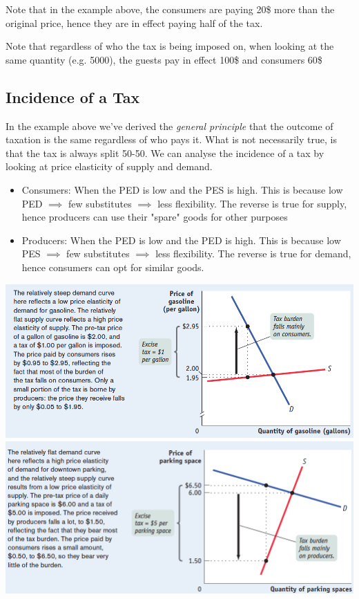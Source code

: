 \documentclass[english,course, draft]{Notes}
\newcommand{\ita}[1]{\textit{#1}}
\begin{document}
\par{Note that in the example above, the consumers are paying 20\$ more than the original price, hence they are in effect paying half of the tax.}


\par{Note that regardless of who the tax is being imposed on, when looking at the same quantity (e.g. 5000), the guests pay in effect 100\$ and consumers 60\$}

\subsection{Incidence of a Tax}

\par{In the example above we've derived the \ita{general principle} that the outcome of taxation is the same regardless of who pays it. What is not necessarily true, is that the tax is always split 50-50. We can analyse the incidence of a tax by looking at price elasticity of supply and demand.}

\begin{itemize}
	\item[] Consumers: When the PED is low and the PES is high. This is because low PED $\implies$ few substitutes $\implies$ less flexibility. The reverse is true for supply, hence producers can use their "spare" goods for other purposes
	\item[] Producers: When the PED is low and the PED is high. This is because low PES $\implies$ few substitutes $\implies$ less flexibility. The reverse is true for demand, hence consumers can opt for similar goods.
\end{itemize}

\includegraphics[width=\textwidth]{tax2} 
\includegraphics[width=\textwidth]{tax3} 
\end{document}
